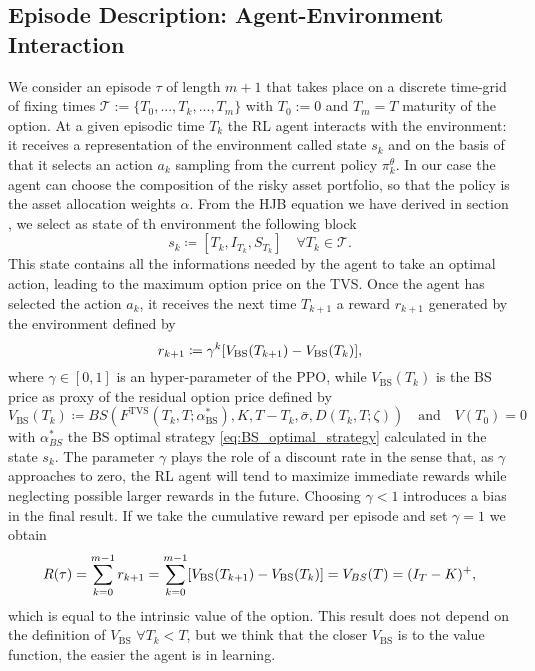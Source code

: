 \documentclass[11pt]{article}
\begin{document}
 \subsection{Episode Description: Agent-Environment Interaction}
 We consider an episode $\tau$ of length $m+1$ that takes place on a discrete time-grid of fixing times $\mathcal{T}:=\{T_0,...,T_k,...,T_m\}$ with $T_0:=0$ and $T_m=T$ maturity of the option. At a given episodic time $T_k$ the RL agent interacts with the environment: it receives a representation of the environment called state $s_k$ and on the basis of that it selects an action $a_k$ sampling from the current policy $\pi^\theta_k$.
 In our case the agent can choose the composition of the risky asset portfolio, so that the policy is the asset allocation weights $\alpha$. From the HJB equation we have derived in section , we select as state of th environment the following block
 \begin{equation}
 	s_{k} \coloneqq \left[T_k,I_{T_k}, S_{T_k}\right] \quad \forall T_k \in \mathcal{T}.
 \label{eq:state}\end{equation}
 This state contains all the informations needed by the agent to take an optimal action, leading to the maximum option price on the TVS. 
 Once the agent has selected the action $a_k$, it receives the next time $T_{k+1}$ a reward $r_{k+1}$ generated by the environment defined by
 \begin{equation}
 	r_{k+1} \coloneqq  \gamma^{k}[V_{\text{BS}}(T_{k+1})-V_\text{\text{BS}}(T_k)],
 \label{eq:reward}\end{equation}
where $\gamma \in[0,1]$ is an hyper-parameter of the PPO, while $V_{\text{BS}}(T_k)$ is the BS price as proxy of the residual option price defined by
\begin{equation}
	V_{\text{BS}}(T_k) \coloneqq BS(F^{\text{TVS}}(T_k,T;\alpha^*_{\text{BS}}),K,T-T_k,\bar{\sigma},D(T_k,T;\zeta)) \quad \text{and} \quad V(T_0)=0
\end{equation} 
with $\alpha^*_{BS}$ the BS optimal strategy \eqref{eq:BS_optimal_strategy} calculated in the state $s_k$. The parameter $\gamma$ plays the role of a discount rate in the sense that, as $\gamma$ approaches to zero, the RL agent will tend to maximize immediate rewards while neglecting possible larger rewards in the future. Choosing $\gamma<1$ introduces a bias in the final result.
If we take the cumulative reward per episode and set $\gamma =1$ we obtain
\begin{equation}
	R(\tau) = \sum_{k=0}^{m-1} r_{k+1} = \sum_{k=0}^{m-1}[V_{\text{BS}}(T_{k+1})-V_\text{\text{BS}}(T_k)] = V_{BS}(T) = (I_T-K)^+,
\end{equation} 
which is equal to the intrinsic value of the option. This result does not depend on the definition of $V_{\text{BS}}$  $\forall T_k<T$, but we think that the closer $V_{\text{BS}}$ is to the value function, the easier the agent is in learning.
\end{document}
